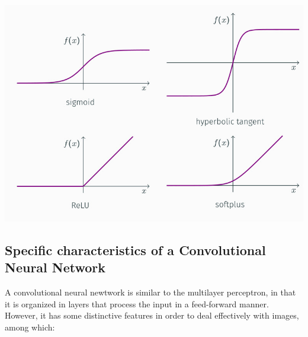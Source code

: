 \documentclass[10pt]{report}
\begin{document}
\begin{center}
\includegraphics[width=.9\linewidth]{./pics/cnn/activation-functions.jpg}
\end{center}

\subsection{Specific characteristics of a Convolutional Neural Network}
\label{sec:orge97d342}
A convolutional neural newtwork is similar to the multilayer perceptron,
in that it is organized in layers that process the input in a
feed-forward manner. However, it has some distinctive features in order to deal effectively with images, among
which:
\end{document}
